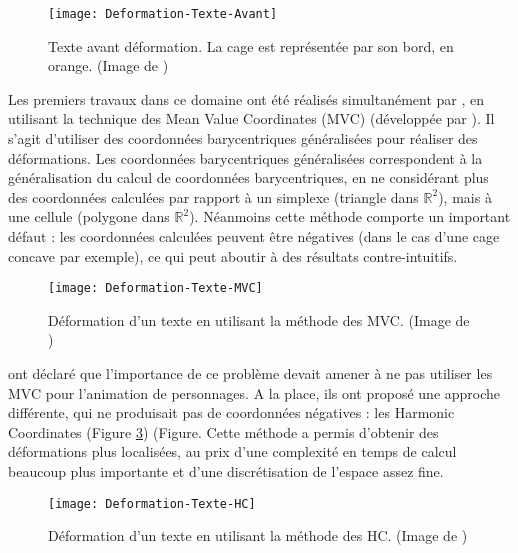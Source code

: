 \begin{figure}[ht]
\begin{center}
\texttt{[image: Deformation-Texte-Avant]}

\caption[Texte avant déformation] {Texte avant déformation. La cage est
représentée par son bord, en orange. (Image de \cite{LLC08})}

\label{DEFAva}
\end{center}
\end{figure}

Les premiers travaux dans ce domaine ont été réalisés simultanément par
\cite{JSW05} \cite{FKR05}, en utilisant la technique des Mean Value
Coordinates (MVC) (développée par \cite{Flo03}). Il s'agit d'utiliser des
coordonnées barycentriques généralisées pour réaliser des déformations. Les
coordonnées barycentriques généralisées correspondent à la généralisation du
calcul de coordonnées barycentriques, en ne considérant plus des coordonnées
calculées par rapport à un simplexe (triangle dans $\mathbb{R}^2$), mais à une
cellule (polygone dans $\mathbb{R}^2$). Néanmoins cette méthode comporte un
important défaut : les coordonnées calculées peuvent être négatives (dans le
cas d'une cage concave par exemple), ce qui peut aboutir à des
résultats contre-intuitifs.

\begin{figure}[ht]
\begin{center}
\texttt{[image: Deformation-Texte-MVC]}

\caption[Déformation d'un texte (MVC)] {Déformation d'un texte en utilisant la
méthode des MVC. (Image de \cite{LLC08})}

\label{DEFMea}
\end{center}
\end{figure}

\cite{JMDGS07} ont déclaré que l'importance de ce problème devait amener à ne
pas utiliser les MVC pour l'animation de personnages. A la place, ils ont
proposé une approche différente, qui ne produisait pas de coordonnées
négatives : les Harmonic Coordinates (Figure \ref{DEFHar}) (Figure. Cette méthode a permis d'obtenir
des déformations plus localisées, au prix d'une complexité en temps de
calcul beaucoup plus importante et d'une discrétisation de l'espace assez
fine.

\begin{figure}[ht]
\begin{center}
\texttt{[image: Deformation-Texte-HC]}

\caption[Déformation d'un texte (HC)] {Déformation d'un texte en utilisant la
méthode des HC. (Image de \cite{LLC08})}

\label{DEFHar}
\end{center}
\end{figure}

